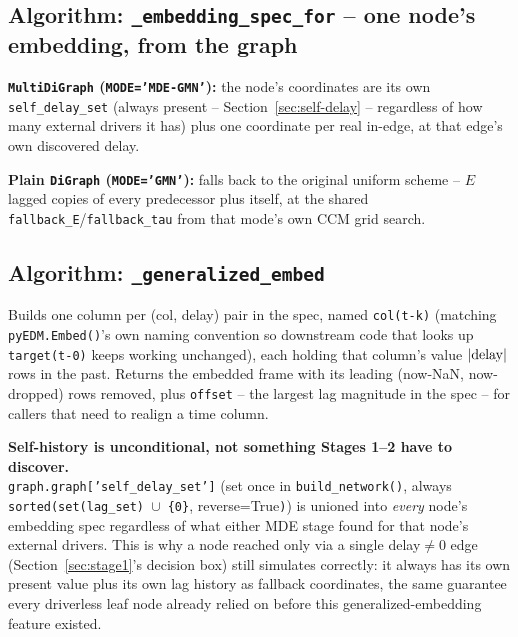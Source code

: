 \documentclass[11pt]{article}
\newenvironment{notebox}[1]{%
  \begin{framed}%
  \noindent\textbf{#1}\\[2pt]%
}{%
  \end{framed}%
}
\begin{document}
\subsection{Algorithm: \texttt{\_embedding\_spec\_for} -- one node's embedding, from the graph}
\begin{steps}
\item \textbf{\texttt{MultiDiGraph} (\texttt{MODE='MDE-GMN'}):} the node's coordinates are its own \texttt{self\_delay\_set} (always present -- Section~\ref{sec:self-delay} -- regardless of how many external drivers it has) plus one coordinate per real in-edge, at that edge's own discovered delay.
\item \textbf{Plain \texttt{DiGraph} (\texttt{MODE='GMN'}):} falls back to the original uniform scheme -- $E$ lagged copies of every predecessor plus itself, at the shared \texttt{fallback\_E}/\texttt{fallback\_tau} from that mode's own CCM grid search.
\end{steps}

\subsection{Algorithm: \texttt{\_generalized\_embed}}
Builds one column per (col, delay) pair in the spec, named \texttt{col(t-k)} (matching \texttt{pyEDM.Embed()}'s own naming convention so downstream code that looks up \texttt{target(t-0)} keeps working unchanged), each holding that column's value $|{\rm delay}|$ rows in the past. Returns the embedded frame with its leading (now-NaN, now-dropped) rows removed, plus \texttt{offset} -- the largest lag magnitude in the spec -- for callers that need to realign a time column.

\begin{notebox}{Self-history is unconditional, not something Stages 1--2 have to discover.\label{sec:self-delay}}
\texttt{graph.graph['self\_delay\_set']} (set once in \texttt{build\_network()}, always \texttt{sorted(set(lag\_set) $\cup$ \{0\}}, reverse=True\texttt{)}) is unioned into \emph{every} node's embedding spec regardless of what either MDE stage found for that node's external drivers. This is why a node reached only via a single delay$\ne$0 edge (Section~\ref{sec:stage1}'s decision box) still simulates correctly: it always has its own present value plus its own lag history as fallback coordinates, the same guarantee every driverless leaf node already relied on before this generalized-embedding feature existed.
\end{notebox}
\end{document}
